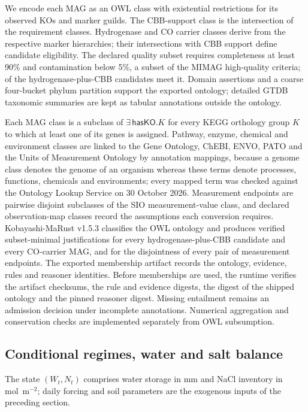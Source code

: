 \documentclass[11pt,a4paper]{article}
\begin{document}
We encode each MAG as an OWL class with existential restrictions for its observed KOs and marker guilds. The CBB-support class is the intersection of the requirement classes. Hydrogenase and CO carrier classes derive from the respective marker hierarchies; their intersections with CBB support define candidate eligibility. The declared quality subset requires completeness at least 90\% and contamination below 5\%, a subset of the MIMAG high-quality criteria; \HtwoCBBStrict{} of the hydrogenase-plus-CBB candidates meet it. Domain assertions and a coarse four-bucket phylum partition support the exported ontology; detailed GTDB taxonomic summaries are kept as tabular annotations outside the ontology.

Each MAG class is a subclass of $\exists\,\mathsf{hasKO}.K$ for every KEGG orthology group $K$ to which at least one of its genes is assigned. Pathway, enzyme, chemical and environment classes are linked to the Gene Ontology, ChEBI, ENVO, PATO and the Units of Measurement Ontology by annotation mappings, because a genome class denotes the genome of an organism whereas these terms denote processes, functions, chemicals and environments; every mapped term was checked against the Ontology Lookup Service on 30 October 2026. Measurement endpoints are pairwise disjoint subclasses of the SIO measurement-value class, and declared observation-map classes record the assumptions each conversion requires. Kobayashi-MaRust v1.5.3 classifies the OWL ontology and produces verified subset-minimal justifications for every hydrogenase-plus-CBB candidate and every CO-carrier MAG, and for the disjointness of every pair of measurement endpoints. The exported membership artifact records the ontology, evidence, rules and reasoner identities. Before memberships are used, the runtime verifies the artifact checksums, the rule and evidence digests, the digest of the shipped ontology and the pinned reasoner digest. Missing entailment remains an admission decision under incomplete annotations. Numerical aggregation and conservation checks are implemented separately from OWL subsumption.

\subsection{Conditional regimes, water and salt balance}
The state $(W_t,N_t)$ comprises water storage in mm and NaCl inventory in mol~m$^{-2}$; daily forcing and soil parameters are the exogenous inputs of the preceding section.
\end{document}
